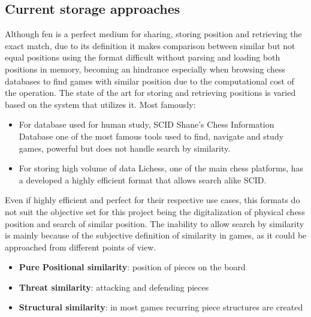 
\subsection{Current storage approaches}
Although fen is a perfect medium for sharing, storing position and retrieving the exact match, 
due to its definition it makes comparison between similar but not equal positions using the format
difficult without parsing and loading both positions in memory, 
becoming an hindrance especially when browsing chess databases to find games with similar position due to the computational cost of the operation.
\newline
The state of the art for storing and retrieving positions is varied based on the system that utilizes it. Most famously:
\begin{itemize}
    \item 
    { 
        For database used for human study, SCID Shane's Chess Information Database \cite{retrieval:scid} one of the most famous tools used to find, navigate and study games, powerful but does not handle search by similarity.
    }
    \item 
    {
        For storing high volume of data Lichess, one of the main chess platforms, has a developed a highly efficient format \cite{retrieval:lichess:format} that allows search alike SCID.
    }
\end{itemize}
Even if highly efficient and perfect for their respective use cases, this formats do not suit the objective set for this project being the digitalization
of physical chess position and search of similar position. 
\newline
The inability to allow search by similarity is mainly because of the subjective definition of similarity in games, as it could be approached from different points of view.
\begin{itemize}
    \item 
    {
        \textbf{Pure Positional similarity}: position of pieces on the board
    }
    \item 
    {
        \textbf{Threat similarity}: attacking and defending pieces
    }
    \item
    {
        \textbf{Structural similarity}: in most games recurring piece structures are created
    }
\end{itemize}
